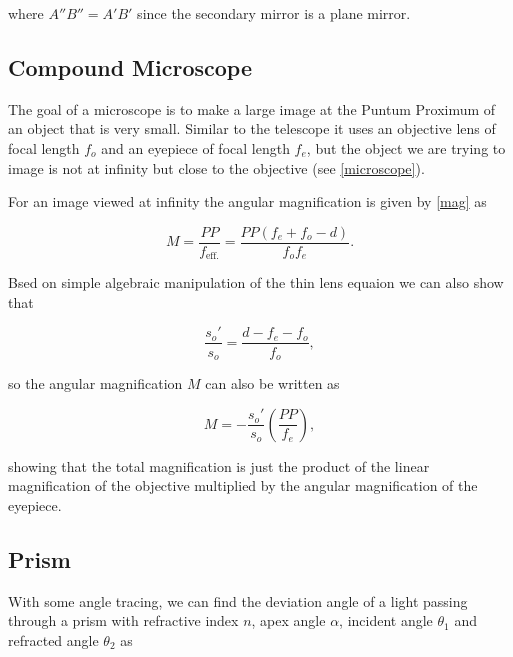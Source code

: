\documentclass[english,a4paper,12pt]{report}
\begin{document}
where \(A''B'' = A'B'\) since the secondary mirror is a plane mirror. 


\subsection{Compound Microscope}

The goal of a microscope is to make a large image at the Puntum Proximum of an object that is very small. Similar to the telescope it uses an objective lens of focal length \(f_{o} \) and an eyepiece of focal length \(f_{e} \), but the object we are trying to image is not at infinity but close to the objective (see \cref{microscope}).

For an image viewed at infinity the angular magnification is given by \cref{mag} as

\begin{equation}
    M = \frac{PP}{f_{\text{eff.} } } = \frac{PP(f_{e} + f_{o} - d  )}{f_{o}f_{e}  }.
\end{equation}

Bsed on simple algebraic manipulation of the thin lens equaion we can also show that 

\begin{equation}
    \frac{s _{o}' }{s _{o} } = \frac{d-f_{e}-f_{o}  }{f_{o} }, 
\end{equation}

so the angular magnification \(M\) can also be written as 

\begin{equation}
    M = -\frac{s _{o}'}{s _{o} } \left( \frac{PP}{f_{e} }  \right),
\end{equation}

showing that the total magnification is just the product of the linear magnification of the objective multiplied by the angular magnification of the eyepiece.






\subsection{Prism}

With some angle tracing, we can find the deviation angle of a light passing through a prism with refractive index \(n\), apex angle \(\alpha \), incident angle \(\theta _{1} \) and refracted angle \(\theta _{2} \)  as 
\end{document}
